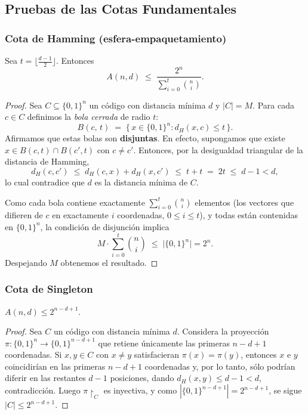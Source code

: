 \documentclass[12pt, spanish]{article}
\begin{document}
\subsection*{Pruebas de las Cotas Fundamentales}
\label{sub:pruebas_cotas}

\subsubsection*{Cota de Hamming (esfera-empaquetamiento)}

\begin{proposition}
Sea $t = \lfloor \frac{d-1}{2} \rfloor$. Entonces
\[
  A(n,d) \;\le\; \frac{2^n}{\displaystyle\sum_{i=0}^{t}\binom{n}{i}}.
\]
\end{proposition}

\begin{proof}
Sea $C \subseteq \{0,1\}^n$ un código con distancia mínima $d$ y $|C| = M$.
Para cada $c \in C$ definimos la \emph{bola cerrada} de radio $t$:
\[
  B(c,\,t) \;=\; \bigl\{\,x \in \{0,1\}^n : d_H(x,c) \le t\,\bigr\}.
\]
Afirmamos que estas bolas son \textbf{disjuntas}.
En efecto, supongamos que existe $x \in B(c,t) \cap B(c',t)$ con $c \neq c'$.
Entonces, por la desigualdad triangular de la distancia de Hamming,
\[
  d_H(c,c') \;\le\; d_H(c,x) + d_H(x,c') \;\le\; t + t \;=\; 2t \;\le\; d-1 < d,
\]
lo cual contradice que $d$ es la distancia mínima de $C$.

Como cada bola contiene exactamente $\sum_{i=0}^{t}\binom{n}{i}$ elementos
(los vectores que difieren de $c$ en exactamente $i$ coordenadas, $0 \le i \le t$),
y todas están contenidas en $\{0,1\}^n$, la condición de disjunción implica
\[
  M \cdot \sum_{i=0}^{t}\binom{n}{i} \;\le\; \bigl|\{0,1\}^n\bigr| = 2^n.
\]
Despejando $M$ obtenemos el resultado.
\end{proof}

\subsubsection*{Cota de Singleton}

\begin{proposition}
$A(n,d) \le 2^{n-d+1}$.
\end{proposition}

\begin{proof}
Sea $C$ un código con distancia mínima $d$.
Considera la proyección $\pi : \{0,1\}^n \to \{0,1\}^{n-d+1}$ que retiene
únicamente las primeras $n-d+1$ coordenadas.
Si $x, y \in C$ con $x \neq y$ satisfacieran $\pi(x) = \pi(y)$,
entonces $x$ e $y$ coincidirían en las primeras $n-d+1$ coordenadas y,
por lo tanto, sólo podrían diferir en las restantes $d-1$ posiciones,
dando $d_H(x,y) \le d-1 < d$, contradicción.
Luego $\pi\!\restriction_C$ es inyectiva, y como
$|\{0,1\}^{n-d+1}| = 2^{n-d+1}$, se sigue $|C| \le 2^{n-d+1}$.
\end{proof}
\end{document}
